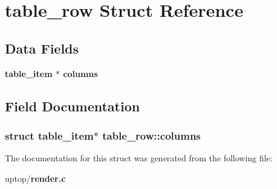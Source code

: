 \section{table\_\-row Struct Reference}
\label{structtable__row}
\subsection*{Data Fields}
\begin{CompactItemize}
\item 
\bf{table\_\-item} $\ast$ \bf{columns}
\end{CompactItemize}


\subsection{Field Documentation}
\subsubsection{\setlength{\rightskip}{0pt plus 5cm}struct \bf{table\_\-item}$\ast$ \bf{table\_\-row::columns}}\label{structtable__row_ba4c5eff8708ba71c7b3c8df156648a0}




The documentation for this struct was generated from the following file:\begin{CompactItemize}
\item 
uptop/\bf{render.c}\end{CompactItemize}
